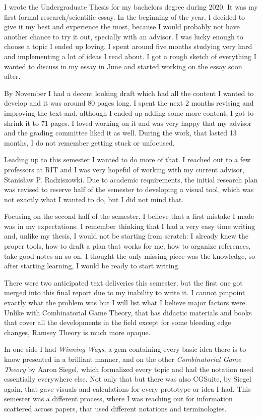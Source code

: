 I wrote the Undergraduate Thesis for my bachelors degree during 2020. It was my first formal research/scientific essay. In the beginning of the year, I decided to give it my best and experience the most, because I would probably not have another chance to try it out, specially with an advisor. I was lucky enough to choose a topic I ended up loving. I spent around five months studying very hard and implementing a lot of ideas I read about. I got a rough sketch of everything I wanted to discuss in my essay in June and started working on the essay soon after.

By November I had a decent looking draft which had all the content I wanted to develop and it was around 80 pages long. I spent the next 2 months revising and improving the text and, although I ended up adding some more content, I got to shrink it to 71 pages. I loved working on it and was very happy that my advisor and the grading committee liked it as well. During the work, that lasted 13 months, I do not remember getting stuck or unfocused.

Leading up to this semester I wanted to do more of that. I reached out to a few professors at RIT and I was very hopeful of working with my current advisor, Stanis\l{}aw P. Radziszowki. Due to academic requirements, the initial research plan was revised to reserve half of the semester to developing a visual tool, which was not exactly what I wanted to do, but I did not mind that.

Focusing on the second half of the semester, I believe that a first mistake I made was in my expectations. I remember thinking that I had a very easy time writing and, unlike my thesis, I would not be starting from scratch: I already knew the proper tools, how to draft a plan that works for me, how to organize references, take good notes an so on. I thought the only missing piece was the knowledge, so after starting learning, I would be ready to start writing.

There were two anticipated text deliveries this semester, but the first one got merged into this final report due to my inability to write it. I cannot pinpoint exactly what the problem was but I will list what I believe major factors were. Unlike with Combinatorial Game Theory, that has didactic materials and books that cover all the developments in the field except for some bleeding edge changes, Ramsey Theory is much more opaque.

In one side I had \textit{Winning Ways}, a gem containing every basic idea there is to know presented in a brilliant manner, and on the other \textit{Combinatorial Game Theory} by Aaron Siegel, which formalized every topic and had the notation used essentially everywhere else. Not only that but there was also CGSuite, by Siegel again, that gave visuals and calculations for every prototype or idea I had. This semester was a different process, where I was reaching out for information scattered across papers, that used different notations and terminologies.

